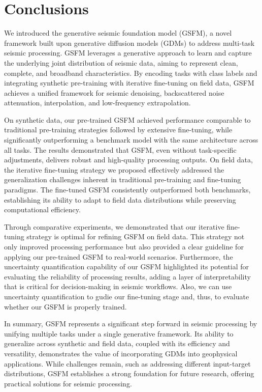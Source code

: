\section{Conclusions}
We introduced the generative seismic foundation model (GSFM), a novel framework built upon generative diffusion models (GDMs) to address multi-task seismic processing. GSFM leverages a generative approach to learn and capture the underlying joint distribution of seismic data, aiming to represent clean, complete, and broadband characteristics. By encoding tasks with class labels and integrating synthetic pre-training with iterative fine-tuning on field data, GSFM achieves a unified framework for seismic denoising, backscattered noise attenuation, interpolation, and low-frequency extrapolation. 

On synthetic data, our pre-trained GSFM achieved performance comparable to traditional pre-training strategies followed by extensive fine-tuning, while significantly outperforming a benchmark model with the same architecture across all tasks. The results demonstrated that GSFM, even without task-specific adjustments, delivers robust and high-quality processing outputs. On field data, the iterative fine-tuning strategy we proposed effectively addressed the generalization challenges inherent in traditional pre-training and fine-tuning paradigms. The fine-tuned GSFM consistently outperformed both benchmarks, establishing its ability to adapt to field data distributions while preserving computational efficiency. 

Through comparative experiments, we demonstrated that our iterative fine-tuning strategy is optimal for refining GSFM on field data. This strategy not only improved processing performance but also provided a clear guideline for applying our pre-trained GSFM to real-world scenarios. Furthermore, the uncertainty quantification capability of our GSFM highlighted its potential for evaluating the reliability of processing results, adding a layer of interpretability that is critical for decision-making in seismic workflows. Also, we can use uncertainty quantification to gudie our fine-tuning stage and, thus, to evaluate whether our GSFM is properly trained. 

In summary, GSFM represents a significant step forward in seismic processing by unifying multiple tasks under a single generative framework. Its ability to generalize across synthetic and field data, coupled with its efficiency and versatility, demonstrates the value of incorporating GDMs into geophysical applications. While challenges remain, such as addressing different input-target distributions, GSFM establishes a strong foundation for future research, offering practical solutions for seismic processing.
